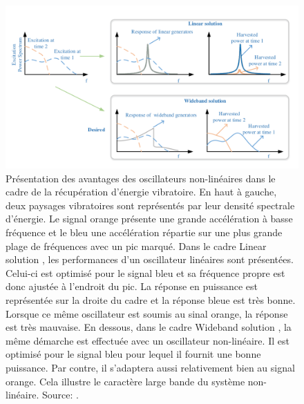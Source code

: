 \documentclass[a4paper, french, 12pt, titlepage]{article}
\begin{document}
\begin{figure}
  \begin{center}
    \includegraphics[width = .8\textwidth]{images/weiqun_lui_harvester2}
  \end{center}
  \caption{Présentation des avantages des oscillateurs non-linéaires dans le cadre de la récupération d'énergie vibratoire.
    En haut à gauche, deux paysages vibratoires sont représentés par leur densité spectrale d'énergie.
    Le signal orange présente une grande accélération à basse fréquence et le bleu une accélération répartie sur une plus grande plage de fréquences avec un pic marqué.
    Dans le cadre \og Linear solution \fg, les performances d'un oscillateur linéaires sont présentées.
    Celui-ci est optimisé pour le signal bleu et sa fréquence propre est donc ajustée à l'endroit du pic.
    La réponse en puissance est représentée sur la droite du cadre et la réponse bleue est très bonne.
    Lorsque ce même oscillateur est soumis au sinal orange, la réponse est très mauvaise.
    En dessous, dans le cadre \og Wideband solution \fg, la même démarche est effectuée avec un oscillateur non-linéaire.
    Il est optimisé pour le signal bleu pour lequel il fournit une bonne puissance.
    Par contre, il s'adaptera aussi relativement bien au signal orange.
    Cela illustre le caractère large bande du système non-linéaire.  Source:  \cite{Liu2014}.}
  \label{fig:wl_wideband}
\end{figure}
\end{document}
